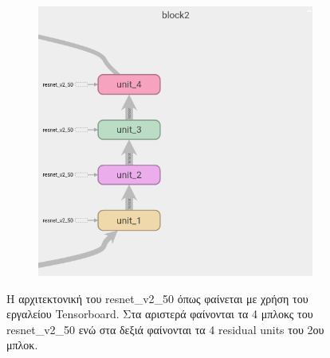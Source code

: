 \begin{figure}[H]
\begin{subfigure}[h]{0.45\textwidth}
		\includegraphics[width=\textwidth]{images/chapter3/resnet_block_example.png}
	\end{subfigure} 
	\caption[Tensorboard - Αρχιτεκτονική του resnet\_v2\_50]{Η αρχιτεκτονική του resnet\_v2\_50 όπως φαίνεται με χρήση του εργαλείου Tensorboard. Στα αριστερά φαίνονται τα 4 μπλοκς του resnet\_v2\_50 ενώ στα δεξιά φαίνονται τα 4 residual units του 2ου μπλοκ.}
	\label{fig:resnet_block}
\end{figure}

